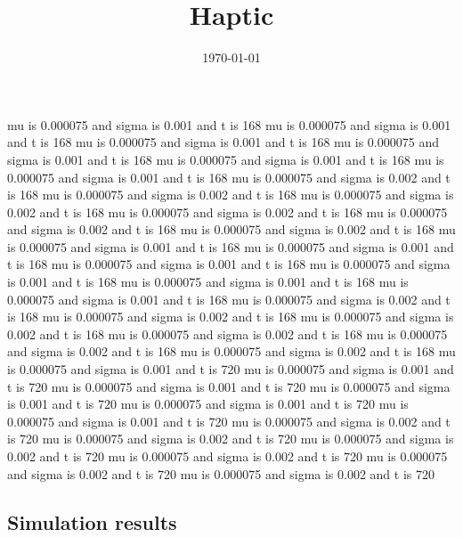\documentclass[
]{article}
\title{Haptic}
\author{}
\date{\vspace{-2.5em}\today}
\begin{document}
\maketitle

{
\setcounter{tocdepth}{2}
\tableofcontents
}
\captionsetup{font=small}
\captionsetup[table]{labelformat=empty}
\captionsetup[table]{labelfont=bf}

mu is 0.000075 and sigma is 0.001 and t is 168 mu is 0.000075 and sigma
is 0.001 and t is 168 mu is 0.000075 and sigma is 0.001 and t is 168 mu
is 0.000075 and sigma is 0.001 and t is 168 mu is 0.000075 and sigma is
0.001 and t is 168 mu is 0.000075 and sigma is 0.001 and t is 168 mu is
0.000075 and sigma is 0.002 and t is 168 mu is 0.000075 and sigma is
0.002 and t is 168 mu is 0.000075 and sigma is 0.002 and t is 168 mu is
0.000075 and sigma is 0.002 and t is 168 mu is 0.000075 and sigma is
0.002 and t is 168 mu is 0.000075 and sigma is 0.002 and t is 168 mu is
0.000075 and sigma is 0.001 and t is 168 mu is 0.000075 and sigma is
0.001 and t is 168 mu is 0.000075 and sigma is 0.001 and t is 168 mu is
0.000075 and sigma is 0.001 and t is 168 mu is 0.000075 and sigma is
0.001 and t is 168 mu is 0.000075 and sigma is 0.001 and t is 168 mu is
0.000075 and sigma is 0.002 and t is 168 mu is 0.000075 and sigma is
0.002 and t is 168 mu is 0.000075 and sigma is 0.002 and t is 168 mu is
0.000075 and sigma is 0.002 and t is 168 mu is 0.000075 and sigma is
0.002 and t is 168 mu is 0.000075 and sigma is 0.002 and t is 168 mu is
0.000075 and sigma is 0.001 and t is 720 mu is 0.000075 and sigma is
0.001 and t is 720 mu is 0.000075 and sigma is 0.001 and t is 720 mu is
0.000075 and sigma is 0.001 and t is 720 mu is 0.000075 and sigma is
0.001 and t is 720 mu is 0.000075 and sigma is 0.001 and t is 720 mu is
0.000075 and sigma is 0.002 and t is 720 mu is 0.000075 and sigma is
0.002 and t is 720 mu is 0.000075 and sigma is 0.002 and t is 720 mu is
0.000075 and sigma is 0.002 and t is 720 mu is 0.000075 and sigma is
0.002 and t is 720 mu is 0.000075 and sigma is 0.002 and t is 720

\newpage

\subsection{Simulation results} 
\label{simres}

\begingroup\fontsize{8}{10}\selectfont
\begingroup\fontsize{8}{10}\selectfont
\end{document}
